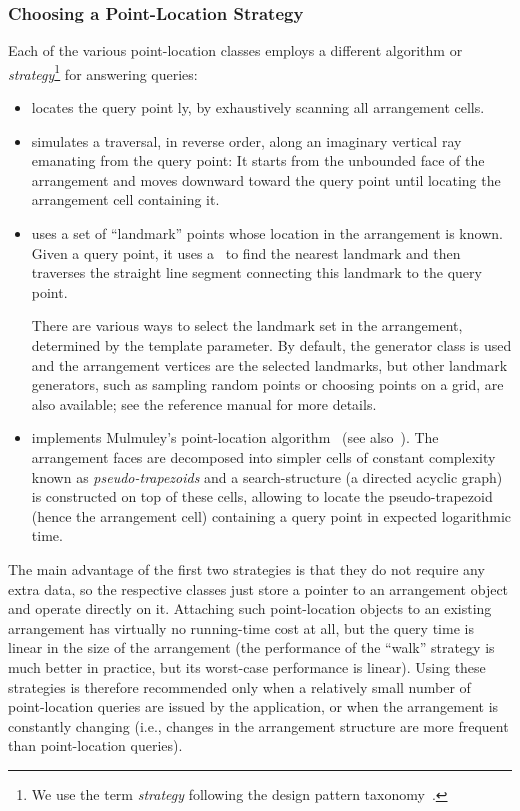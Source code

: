 \subsubsection{Choosing a Point-Location Strategy}
\label{arr_sssec:pl_strat}
%
Each of the various point-location classes employs a different
algorithm or {\em strategy}\footnote{We use the term {\em strategy}
following the design pattern taxonomy~\cite{cgal:ghjv-dpero-95}.}
for answering queries:
\begin{itemize}
\item {} locates the query
point \naive ly, by exhaustively scanning all arrangement cells.
%
\item {}
simulates a traversal, in reverse order, along an imaginary vertical
ray emanating
from the query point: It starts from the unbounded face of the
arrangement and moves downward toward the query point until
locating the arrangement cell containing it.
%
\item {}
uses a set of ``landmark'' points whose location in the
arrangement is known. Given a query point, it uses a \kdtree\ to
find the nearest landmark and then traverses the straight line
segment connecting this landmark to the query point.

There are various ways to select the landmark set in the
arrangement, determined by the  template parameter.
By default, the generator
class  is used and the
arrangement vertices are the selected landmarks, but other
landmark generators, such as sampling random points or
choosing points on a grid, are also available; see the
reference manual for more details.
%
\item {} implements
Mulmuley's point-location algorithm~\cite{m-fppa-90} (see
also~\cite[Chapter~6]{bkos-cgaa-00}). The
arrangement faces are decomposed into simpler cells of constant
complexity known as {\em pseudo-trapezoids} and a search-structure
(a directed acyclic graph) is constructed on top of these cells,
allowing to locate the pseudo-trapezoid (hence the arrangement
cell) containing a query point in expected logarithmic time.
\end{itemize}

The main advantage of the first two strategies is that they do not
require any extra data, so the respective classes just store a
pointer to an arrangement object and operate directly on it.
Attaching such point-location objects to an existing arrangement
has virtually no running-time cost at all, but the query time is
linear in the size of the arrangement (the performance of the
``walk'' strategy is much better in practice, but its worst-case
performance is linear). Using these strategies is therefore
recommended only when a relatively small number of point-location
queries are issued by the application, or when the arrangement is
constantly changing (i.e., changes in the arrangement structure
are more frequent than point-location queries).

